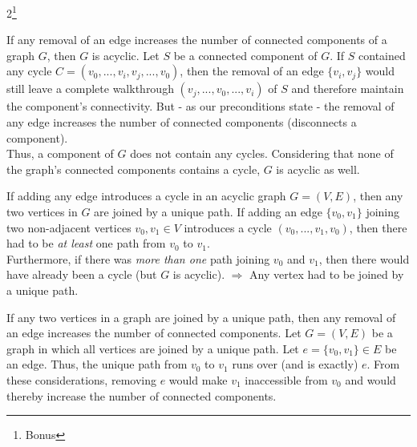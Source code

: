 \documentclass[a4paper]{article}
\begin{document}
	\begin{solution}{2\footnote{Bonus}}
		\begin{theorem}{If any removal of an edge increases the number of connected components of a graph $G$, then $G$ is acyclic.}
			Let $S$ be a connected component of $G$. If $S$ contained any cycle $C = (v_0, ..., v_i, v_j, ..., v_0)$, then the removal of an edge $\{v_i, v_j\}$ would still leave a complete walkthrough $(v_j, ..., v_0, ..., v_i)$ of $S$ and therefore maintain the component's connectivity.
			But - as our preconditions state - the removal of any edge increases the number of connected components (disconnects a component).\\ Thus, a component of $G$ does not contain any cycles. Considering that none of the graph's connected components contains a cycle, $G$ is acyclic as well.
		\end{theorem}
		\begin{theorem}{If adding any edge introduces a cycle in an acyclic graph $G = (V, E)$, then any two vertices in $G$ are joined by a unique path.}
			If adding an edge $\{v_0, v_1\}$ joining two non-adjacent vertices $v_0, v_1 \in V$ introduces a cycle $(v_0, ..., v_1, v_0)$, then there had to be \emph{at least} one path from $v_0$ to $v_1$.\\
			Furthermore, if there was \emph{more than one} path joining $v_0$ and $v_1$, then there would have already been a cycle (but $G$ is acyclic). $\Rightarrow$ Any vertex had to be joined by a unique path.
		\end{theorem}
		\begin{theorem}{If any two vertices in a graph are joined by a unique path, then any removal of an edge increases the number of connected components.}
			Let $G = (V, E)$ be a graph in which all vertices are joined by a unique path. Let $e = \{v_0, v_1\} \in E$ be an edge. Thus, the unique path from $v_0$ to $v_1$ runs over (and is exactly) $e$. From these considerations, removing $e$ would make $v_1$ inaccessible from $v_0$ and would thereby increase the number of connected components.
		\end{theorem}
	\end{solution} 
	\newpage
\end{document}
